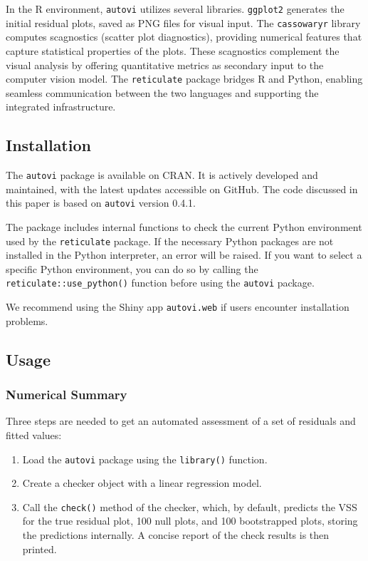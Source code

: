 \documentclass[
doublespace,
  times]{anzsauth}
\providecommand{\tightlist}{%
  \setlength{\itemsep}{0pt}\setlength{\parskip}{0pt}}\usepackage{longtable,booktabs,array}
\begin{document}
In the R environment, \texttt{autovi} utilizes several libraries.
\texttt{ggplot2} \citep{ggplot2} generates the initial residual plots,
saved as PNG files for visual input. The \texttt{cassowaryr}
\citep{mason2022cassowaryr} library computes scagnostics (scatter plot
diagnostics), providing numerical features that capture statistical
properties of the plots. These scagnostics complement the visual
analysis by offering quantitative metrics as secondary input to the
computer vision model. The \texttt{reticulate} \citep{reticulate}
package bridges R and Python, enabling seamless communication between
the two languages and supporting the integrated infrastructure.

\subsection{Installation}\label{installation}

The \texttt{autovi} package is available on CRAN. It is actively
developed and maintained, with the latest updates accessible on GitHub.
The code discussed in this paper is based on \texttt{autovi} version
0.4.1.

The package includes internal functions to check the current Python
environment used by the \texttt{reticulate} package. If the necessary
Python packages are not installed in the Python interpreter, an error
will be raised. If you want to select a specific Python environment, you
can do so by calling the \texttt{reticulate::use\_python()} function
before using the \texttt{autovi} package.

We recommend using the Shiny app \texttt{autovi.web} if users encounter
installation problems.

\subsection{Usage}\label{sec-autovi-usage}

\subsubsection{Numerical Summary}\label{sec-autovi-numerical}

Three steps are needed to get an automated assessment of a set of
residuals and fitted values:

\begin{enumerate}
\def\labelenumi{\arabic{enumi}.}
\tightlist
\item
  Load the \texttt{autovi} package using the \texttt{library()}
  function.
\item
  Create a checker object with a linear regression model.
\item
  Call the \texttt{check()} method of the checker, which, by default,
  predicts the VSS for the true residual plot, 100 null plots, and 100
  bootstrapped plots, storing the predictions internally. A concise
  report of the check results is then printed.
\end{enumerate}
\end{document}
